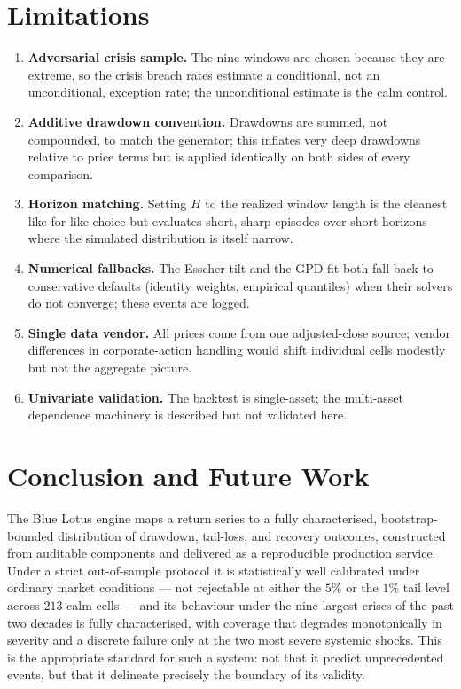 \documentclass[11pt]{article}
\theoremstyle{definition}
\begin{document}
\section{Limitations}
\label{sec:limits}
\begin{enumerate}[leftmargin=1.6em, itemsep=2pt]
  \item \textbf{Adversarial crisis sample.} The nine windows are chosen because
  they are extreme, so the crisis breach rates estimate a conditional, not an
  unconditional, exception rate; the unconditional estimate is the calm control.
  \item \textbf{Additive drawdown convention.} Drawdowns are summed, not
  compounded, to match the generator; this inflates very deep drawdowns relative
  to price terms but is applied identically on both sides of every comparison.
  \item \textbf{Horizon matching.} Setting $H$ to the realized window length is
  the cleanest like-for-like choice but evaluates short, sharp episodes over
  short horizons where the simulated distribution is itself narrow.
  \item \textbf{Numerical fallbacks.} The Esscher tilt and the GPD fit both fall
  back to conservative defaults (identity weights, empirical quantiles) when
  their solvers do not converge; these events are logged.
  \item \textbf{Single data vendor.} All prices come from one adjusted-close
  source; vendor differences in corporate-action handling would shift individual
  cells modestly but not the aggregate picture.
  \item \textbf{Univariate validation.} The backtest is single-asset; the
  multi-asset dependence machinery is described but not validated here.
\end{enumerate}

\section{Conclusion and Future Work}
The Blue Lotus engine maps a return series to a fully characterised, bootstrap-
bounded distribution of drawdown, tail-loss, and recovery outcomes, constructed
from auditable components and delivered as a reproducible production service. Under
a strict out-of-sample protocol it is statistically well calibrated under ordinary
market conditions --- not rejectable at either the $5\%$ or the $1\%$ tail level
across $213$ calm cells --- and its behaviour under the nine largest crises of the
past two decades is fully characterised, with coverage that degrades monotonically
in severity and a discrete failure only at the two most severe systemic shocks.
This is the appropriate standard for such a system: not that it predict
unprecedented events, but that it delineate precisely the boundary of its validity.
\end{document}
